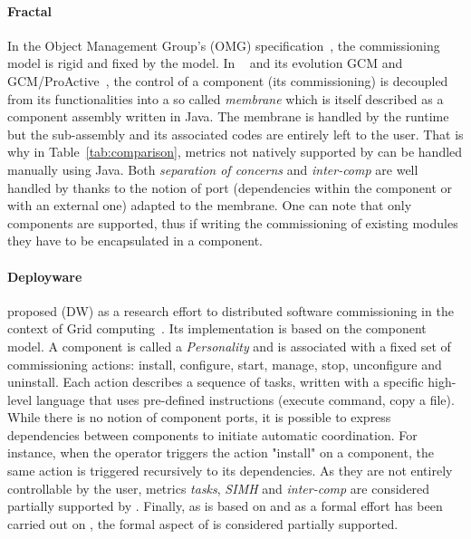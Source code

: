 \paragraph{Fractal}
In the Object Management Group's (OMG) specification~\cite{ccmdeploy:omg06}, the commissioning model is rigid and fixed by the model. In \fractal~\cite{Blair2009} and its evolution GCM and GCM/ProActive~\cite{baude:hal-01001043}, the control of a component (\eg its commissioning) is decoupled from its functionalities into a
so called \emph{membrane} which is itself described as a component assembly written in Java. The membrane is handled by the \fractal runtime but the sub-assembly and its associated codes are entirely left to the user. That is why in Table~\ref{tab:comparison}, metrics not natively supported by \fractal can be handled manually using Java. Both \emph{separation of concerns} and \emph{inter-comp} are well handled by \fractal thanks to the notion of port (dependencies within the component or with an external one) adapted to the
membrane. One can note that only \fractal components are supported, thus if writing the commissioning of existing modules they have to be encapsulated in a \fractal component.

\paragraph{Deployware}
\citeauthor{flissi2008ccgrid} proposed \deployware (DW) as a research effort to distributed software commissioning in the context of Grid computing~\cite{flissi2008ccgrid}. Its implementation is based on the \fractal component model. A component is called a \emph{Personality} and is associated with a fixed set of commissioning actions: install, configure, start, manage, stop, unconfigure and uninstall. Each action describes a sequence of tasks, written with a specific high-level language that uses pre-defined instructions (\eg execute command, copy a file). While there is no notion of component ports, it is possible
to express dependencies between components to initiate automatic coordination. For instance, when the operator triggers the action "install" on a component, the same action is triggered recursively to its dependencies. As they are not entirely controllable by the user, metrics \emph{tasks}, \emph{SIMH} and \emph{inter-comp} are considered partially supported by \deployware. Finally, as \deployware is
based on \fractal and as a formal effort has been carried out on \fractal, the formal aspect of \deployware is considered partially supported.

